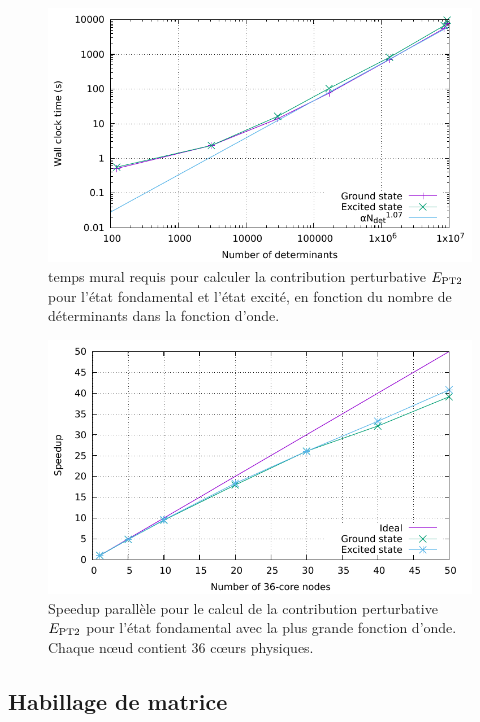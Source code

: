\documentclass[./thesis.tex]{subfiles}
\begin{document}
\begin{figure}[h!]
        \begin{center}
                \includegraphics[width=0.8\columnwidth]{figures/perf/scaling_pt2_det}
                \caption{temps mural requis pour calculer la contribution perturbative $E_\text{PT2}$ pour l'état fondamental et l'état excité, en fonction du nombre de déterminants dans la fonction d'onde.            }
                \label{fig:scaling_det_pt2_fr}
        \end{center}
\end{figure}
\begin{figure}[hbt!]
        \begin{center}
                \includegraphics[width=0.8\columnwidth]{figures/perf/scaling_pt2_node}
                \caption{Speedup parallèle pour le calcul de la contribution perturbative $E_\text{PT2}$ pour l'état fondamental avec la plus grande fonction d'onde. Chaque nœud contient 36 cœurs physiques.               }
                \label{fig:scaling_node_pt2_fr}
        \end{center}
\end{figure}
\subsection{Habillage de matrice}
\end{document}
